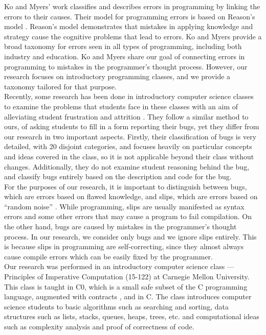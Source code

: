 \documentclass[11pt,letterpaper]{article}
\begin{document}
Ko and Myers' work \cite{KoMyers03} classifies and describes errors in programming by linking the errors to their causes. Their model for programming errors is based on Reason's model \cite{Reason90}. Reason's model demonstrates that mistakes in applying knowledge and strategy cause the cognitive problems that lead to errors. Ko and Myers provide a broad taxonomy for errors seen in all types of programming, including both industry and education. Ko and Myers share our goal of connecting errors in programming to mistakes in the programmer's thought process. However, our research focuses on introductory programming classes, and we provide a taxonomy tailored for that purpose.\\

Recently, some research has been done in introductory computer science classes to examine the problems that students face in these classes with an aim of alleviating student frustration and attrition \cite{BryceCooleyHansenHayrapetyan10}. They follow a similar method to ours, of asking students to fill in a form reporting their bugs, yet they differ from our research in two important aspects. Firstly, their classification of bugs is very detailed, with 20 disjoint categories, and focuses heavily on particular concepts and ideas covered in the class, so it is not applicable beyond their class without changes. Additionally, they do not examine student reasoning behind the bug, and classify bugs entirely based on the description and code for the bug.\\

For the purposes of our research, it is important to distinguish between bugs, which are errors based on flawed knowledge, and slips, which are errors based on ``random noise'' \cite{VanLehn90}. While programming, slips are usually manifested as syntax errors and some other errors that may cause a program to fail compilation. On the other hand, bugs are caused by mistakes in the programmer's thought process. In our research, we consider only bugs and we ignore slips entirely. This is because slips in programming are self-correcting, since they almost always cause compile errors which can be easily fixed by the programmer.\\

Our research was performed in an introductory computer science class --- Principles of Imperative Computation (15-122) at Carnegie Mellon University. This class is taught in C0, which is a small safe subset of the C programming language, augmented with contracts \cite{Arnold10, PfenningCortinaLovas11}, and in C. The class introduces computer science students to basic algorithms such as searching and sorting, data structures such as lists, stacks, queues, heaps, trees, etc. and computational ideas such as complexity analysis and proof of correctness of code.
\end{document}
